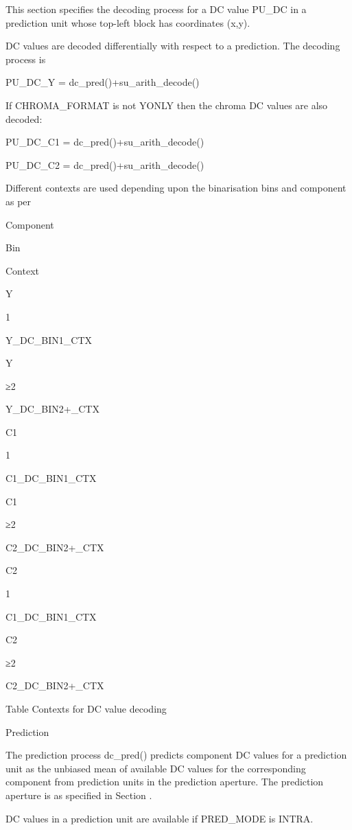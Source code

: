 This section specifies the decoding process for a DC value PU\_DC in a
prediction unit whose top-left block has coordinates (x,y).

DC values are decoded differentially with respect to a prediction. The
decoding process is

PU\_DC\_Y = dc\_pred()+su\_arith\_decode()

If CHROMA\_FORMAT is not YONLY then the chroma DC values are also
decoded:

PU\_DC\_C1 = dc\_pred()+su\_arith\_decode()

PU\_DC\_C2 = dc\_pred()+su\_arith\_decode()

Different contexts are used depending upon the binarisation bins and
component as per 


Component

Bin

Context

Y

1

Y\_DC\_BIN1\_CTX

Y

≥2

Y\_DC\_BIN2+\_CTX

C1

1

C1\_DC\_BIN1\_CTX

C1

≥2

C2\_DC\_BIN2+\_CTX

C2

1

C1\_DC\_BIN1\_CTX

C2

≥2

C2\_DC\_BIN2+\_CTX


Table   Contexts for DC value decoding

Prediction 

The prediction process dc\_pred() predicts component DC values for a
prediction unit as the unbiased mean of available DC values for the
corresponding component from prediction units in the prediction
aperture. The prediction aperture is as specified in Section .

DC values in a prediction unit are available if PRED\_MODE is INTRA.


